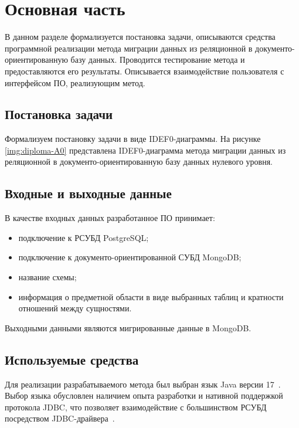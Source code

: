 \chapter{Основная часть}

В данном разделе формализуется постановка задачи, 
описываются средства программной реализации метода 
миграции данных из реляционной в документо-ориентированную базу данных.
Проводится тестирование метода и предоставляются его результаты.
Описывается взаимодействие пользователя с интерфейсом ПО, реализующим метод.



\section{Постановка задачи}
Формализуем постановку задачи в виде IDEF0-диаграммы.
На рисунке \ref{img:diploma-A0} представлена IDEF0-диаграмма метода
миграции данных из реляционной в документо-ориентированную базу данных нулевого уровня.


\clearpage

\section{Входные и выходные данные}
В качестве входных данных разработанное ПО принимает:
\begin{itemize}[label=---]
    \item подключение к РСУБД PostgreSQL;
    \item подключение к документо-ориентированной СУБД MongoDB;
    \item название схемы;
    \item информация о предметной области в виде выбранных таблиц и кратности отношений между сущностями.
\end{itemize}

Выходными данными являются мигрированные данные в MongoDB.


\section{Используемые средства}
Для реализации разрабатываемого метода был выбран язык Java версии 17~\cite{openjdk-17}.
Выбор языка обусловлен наличием опыта разработки и нативной поддержкой протокола JDBC,
что позволяет взаимодействие с большинством РСУБД посредством JDBC-драйвера~\cite{jdbc-api}.

